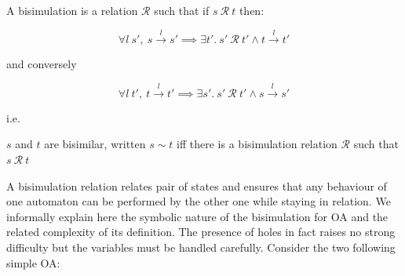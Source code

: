 \documentclass[runningheads]{llncs}
\begin{document}
\begin{definition}
  A bisimulation is a relation $\mathcal{R}$ such that if $s~\mathcal{R}~t$ then:\\
  \begin{minipage}[c]{.6\textwidth}
    \[
      \forall l~s',~ {s}\xrightarrow{l}{s'}
      \implies
      \exists t'.~ s' ~\mathcal{R}~ t'
      \land {t}\xrightarrow{l}{t'}
    \]
\begin{center}    \vspace{-1.5ex}
      and conversely
    \end{center}
    \vspace{-1ex}
    \[
      \forall l~t',~ {t}\xrightarrow{l}{t'}
      \implies
      \exists s'.~ s' ~\mathcal{R}~ t'
      \land {s}\xrightarrow{l}{s'}
    \]
    \vspace{.5ex}
  \end{minipage}
  i.e. \qquad
  \begin{minipage}[c]{.35\textwidth}
  \end{minipage}
$s$ and $t$ are bisimilar, written $s\sim t$ iff there is a bisimulation relation $\mathcal{R}$ such that  $s ~\mathcal{R}~ t$
\end{definition}

A  bisimulation relation  relates pair of states and ensures that any behaviour of one automaton can be performed by the other one while staying in relation. We informally explain here the symbolic nature of the bisimulation for OA and the related complexity of its definition.
 The presence of holes in fact raises no strong difficulty but the variables must be handled carefully.
Consider the two following simple OA:
\end{document}
